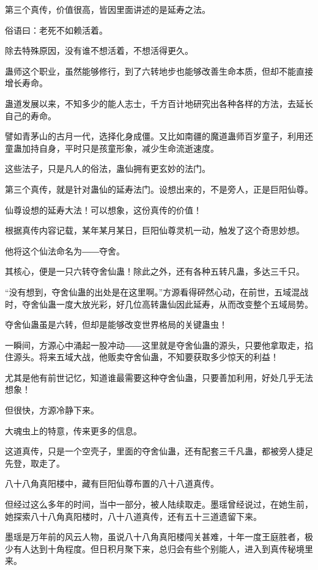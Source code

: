 
\begin{this_body}

第三个真传，价值很高，皆因里面讲述的是延寿之法。

俗语曰：老死不如赖活着。

除去特殊原因，没有谁不想活着，不想活得更久。

蛊师这个职业，虽然能够修行，到了六转地步也能够改善生命本质，但却不能直接增长寿命。

蛊道发展以来，不知多少的能人志士，千方百计地研究出各种各样的方法，去延长自己的寿命。

譬如青茅山的古月一代，选择化身成僵。又比如南疆的魔道蛊师百岁童子，利用还童蛊加持自身，平时只是孩童形象，减少生命流逝速度。

这些法子，只是凡人的俗法，蛊仙拥有更玄妙的法门。

第三个真传，就是针对蛊仙的延寿法门。设想出来的，不是旁人，正是巨阳仙尊。

仙尊设想的延寿大法！可以想象，这份真传的价值！

根据真传内容记载，某年某月某日，巨阳仙尊灵机一动，触发了这个奇思妙想。

他将这个仙法命名为――夺舍。

其核心，便是一只六转夺舍仙蛊！除此之外，还有各种五转凡蛊，多达三千只。

“没有想到，夺舍仙蛊的出处是在这里啊。”方源看得砰然心动，在前世，五域混战时，夺舍仙蛊一度大放光彩，好几位高转蛊仙因此延寿，从而改变整个五域局势。

夺舍仙蛊虽是六转，但却是能够改变世界格局的关键蛊虫！

一瞬间，方源心中涌起一股冲动――这里就是夺舍仙蛊的源头，只要他拿取走，掐住源头。将来五域大战，他贩卖夺舍仙蛊，不知要获取多少惊天的利益！

尤其是他有前世记忆，知道谁最需要这种夺舍仙蛊，只要善加利用，好处几乎无法想象！

但很快，方源冷静下来。

大魂虫上的特意，传来更多的信息。

这道真传，只是一个空壳子，里面的夺舍仙蛊，还有配套三千凡蛊，都被旁人捷足先登，取走了。

八十八角真阳楼中，藏有巨阳仙尊布置的八十八道真传。

但经过这么多年的时间，当中一部分，被人陆续取走。墨瑶曾经说过，在她生前，她探索八十八角真阳楼时，八十八道真传，还有五十三道遗留下来。

墨瑶是万年前的风云人物，虽说八十八角真阳楼闯关甚难，十年一度王庭胜者，极少有人达到十角程度。但日积月聚下来，总归会有些个别能人，进入到真传秘境里来。


\end{this_body}
